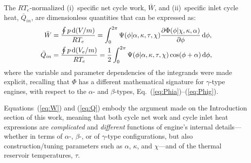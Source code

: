     The $RT_e$-normalized (i)~specific net cycle work, $\bar{W}$, and (ii)~specific inlet  cycle
    heat, $\bar{Q}_{in}$, are dimensionless quantities that can be expressed as:
    \begin{align}
        \label{eq:W}
        \bar{W}         &= \frac{\oint p\,\mathrm{d}(V/m)}{RT_e}
                         = \int_0^{2\pi} \Psi(\phi | \alpha, \kappa, \tau, \chi) \frac{\partial\Phi(\phi | \chi, \kappa, \alpha)}{\partial\phi}\,\mathrm{d}\phi,\\
        \label{eq:Q}
        \bar{Q}_{in}    &= \frac{\oint p\,\mathrm{d}(V_e/m)}{RT_e}
                         = \frac{1}{2} \int_0^{2\pi} \Psi(\phi | \alpha, \kappa, \tau, \chi) \cos(\phi + \alpha) \,\mathrm{d}\phi,
    \end{align}
    \noindent where the  variable  and  parameter  dependencies  of  the  integrands  were  made
    explicit, recalling that $\Phi$ has a different  mathematical  signature  for  $\gamma$-type
    engines,      with      respect      to      the      $\alpha$-      and      $\beta$-types,
    Eq.~(\ref{eq:Phia})--(\ref{eq:Phig}).

    Equations~(\ref{eq:W}) and (\ref{eq:Q}) embody the argument made on the Introduction section
    of this work, meaning that both  cycle  net  work  and  cycle  inlet  heat  expressions  are
    \emph{complicated} and \emph{different} functions of engine's internal details---whether  in
    terms   of   $\alpha$-,   $\beta$-,   or   of   $\gamma$-type   configurations,   but   also
    construction/tuning parameters such as $\alpha$, $\kappa$, and $\chi$---and of  the  thermal
    reservoir temperatures, $\tau$.


